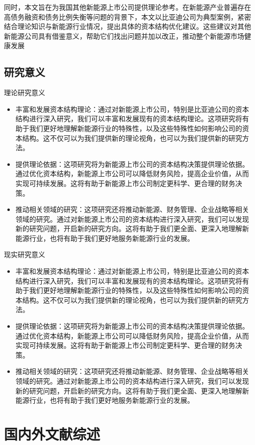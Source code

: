 同时，本文旨在为我国其他新能源上市公司提供理论参考。在新能源产业普遍存在高债务融资和债务比例失衡等问题的背景下，本文以比亚迪公司为典型案例，紧密结合理论知识与新能源行业情况，提出具体的资本结构优化建议。这些建议对其他新能源公司具有借鉴意义，帮助它们找出问题并加以改正，推动整个新能源市场健康发展
\subsection{研究意义}
理论研究意义
\begin{itemize}
\item 丰富和发展资本结构理论：通过对新能源上市公司，特别是比亚迪公司的资本结构进行深入研究，我们可以丰富和发展现有的资本结构理论。这项研究将有助于我们更好地理解新能源行业的特殊性，以及这些特殊性如何影响公司的资本结构。这不仅可以为我们提供新的理论视角，也可以为我们提供新的研究方法。
\item 提供理论依据：这项研究将为新能源上市公司的资本结构决策提供理论依据。通过优化资本结构，新能源上市公司可以降低财务风险，提高企业价值，从而实现可持续发展。这将有助于新能源上市公司制定更科学、更合理的财务决策。
\item 推动相关领域的研究：这项研究还将推动新能源、财务管理、企业战略等相关领域的研究。通过对新能源上市公司的资本结构进行深入研究，我们可以发现新的研究问题，开启新的研究方向。这将有助于我们更全面、更深入地理解新能源行业，也将有助于我们更好地服务新能源行业的发展。
\end{itemize}

现实研究意义
\begin{itemize}
\item 丰富和发展资本结构理论：通过对新能源上市公司，特别是比亚迪公司的资本结构进行深入研究，我们可以丰富和发展现有的资本结构理论。这项研究将有助于我们更好地理解新能源行业的特殊性，以及这些特殊性如何影响公司的资本结构。这不仅可以为我们提供新的理论视角，也可以为我们提供新的研究方法。
\item 提供理论依据：这项研究将为新能源上市公司的资本结构决策提供理论依据。通过优化资本结构，新能源上市公司可以降低财务风险，提高企业价值，从而实现可持续发展。这将有助于新能源上市公司制定更科学、更合理的财务决策。
\item 推动相关领域的研究：这项研究还将推动新能源、财务管理、企业战略等相关领域的研究。通过对新能源上市公司的资本结构进行深入研究，我们可以发现新的研究问题，开启新的研究方向。这将有助于我们更全面、更深入地理解新能源行业，也将有助于我们更好地服务新能源行业的发展。
\end{itemize}
\section{国内外文献综述}
